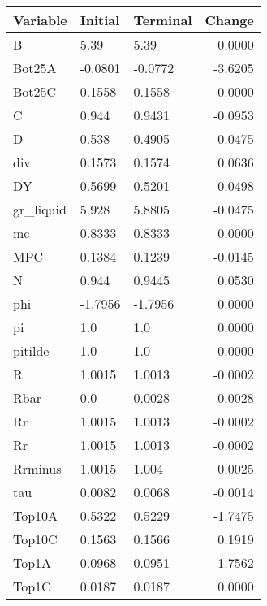 \begin{table}
\centering
\label{tab:stst_comparison_end_L_wedge_permanent}
\begin{tabular}{lllr}
\toprule
                Variable & Initial & Terminal &  Change \\
\midrule
                       B &    5.39 &     5.39 &  0.0000 \\
                  Bot25A & -0.0801 &  -0.0772 & -3.6205 \\
                  Bot25C &  0.1558 &   0.1558 &  0.0000 \\
                       C &   0.944 &   0.9431 & -0.0953 \\
                       D &   0.538 &   0.4905 & -0.0475 \\
                     div &  0.1573 &   0.1574 &  0.0636 \\
                      DY &  0.5699 &   0.5201 & -0.0498 \\
               gr\_liquid &   5.928 &   5.8805 & -0.0475 \\
                      mc &  0.8333 &   0.8333 &  0.0000 \\
                     MPC &  0.1384 &   0.1239 & -0.0145 \\
                       N &   0.944 &   0.9445 &  0.0530 \\
                     phi & -1.7956 &  -1.7956 &  0.0000 \\
                      pi &     1.0 &      1.0 &  0.0000 \\
                 pitilde &     1.0 &      1.0 &  0.0000 \\
                       R &  1.0015 &   1.0013 & -0.0002 \\
                    Rbar &     0.0 &   0.0028 &  0.0028 \\
                      Rn &  1.0015 &   1.0013 & -0.0002 \\
                      Rr &  1.0015 &   1.0013 & -0.0002 \\
                 Rrminus &  1.0015 &    1.004 &  0.0025 \\
                     tau &  0.0082 &   0.0068 & -0.0014 \\
                  Top10A &  0.5322 &   0.5229 & -1.7475 \\
                  Top10C &  0.1563 &   0.1566 &  0.1919 \\
                   Top1A &  0.0968 &   0.0951 & -1.7562 \\
                   Top1C &  0.0187 &   0.0187 &  0.0000 \\

\end{tabular}
\end{table}

